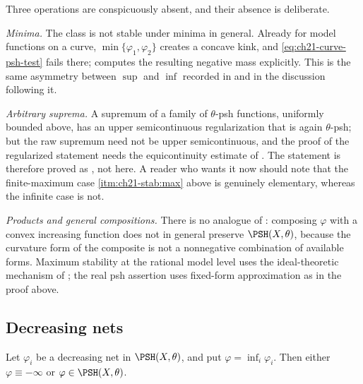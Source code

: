 \begin{remark}
\label{rem:ch21-not-stable}
Three operations are conspicuously absent, and their absence is deliberate.

\emph{Minima.}  The class is not stable under minima in general.  Already for model functions on a curve,
$\min\{\varphi_1,\varphi_2\}$ creates a concave kink, and
\eqref{eq:ch21-curve-psh-test} fails there;
 computes the resulting negative mass
explicitly.  This is the same asymmetry between $\sup$ and $\inf$
recorded in  and in the discussion following it.

\emph{Arbitrary suprema.}  A supremum of a family of $\theta$-psh
functions, uniformly bounded above, has an upper semicontinuous
regularization that is again $\theta$-psh; but the raw supremum need not
be upper semicontinuous, and the proof of the regularized statement needs
the equicontinuity estimate of .  The statement
is therefore proved as , not here.  A reader
who wants it now should note that the finite-maximum case
\cref{itm:ch21-stab:max} above is genuinely elementary, whereas the infinite
case is not.

\emph{Products and general compositions.}  There is no analogue of
: composing $\varphi$ with a convex increasing
function does not in general preserve $\PSH(X,\theta)$, because the
curvature form of the composite is not a nonnegative combination of
available forms.  Maximum stability at the rational model level uses the
ideal-theoretic mechanism of ; the real psh
assertion uses fixed-form approximation as in the proof above.
\end{remark}

\subsection{Decreasing nets}
\label{sec:ch21-decreasing}

\begin{theorem}\label{thm:ch21-decreasing-stability}
Let $\varphi_i$ be a decreasing net in $\PSH(X,\theta)$, and put
$\varphi=\inf_i\varphi_i$.  Then either
$\varphi\equiv-\infty$ or $\varphi\in\PSH(X,\theta)$.
\end{theorem}

